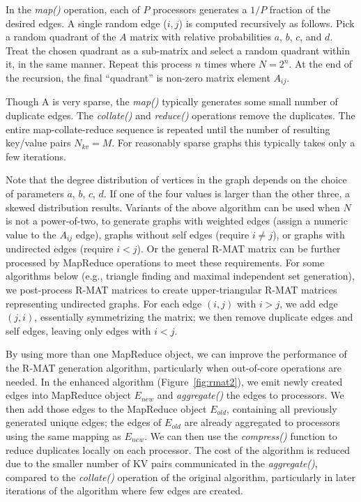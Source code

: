 In the {\it map()} operation, each of $P$ processors generates a $1/P$
fraction of the desired edges.  A single random edge ($i,j$) is computed
recursively as follows.  Pick a random quadrant of the $A$ matrix with
relative probabilities $a$, $b$, $c$, and $d$.  Treat the chosen
quadrant as a sub-matrix and select a random quadrant within it, in
the same manner.  Repeat this process $n$ times where $N = 2^n$.  At
the end of the recursion, the final ``quadrant'' is non-zero matrix
element $A_{ij}$.

Though A is very sparse, the {\it map()} typically generates some
small number of duplicate edges.  The {\it collate()} and {\it
reduce()} operations remove the duplicates.  The entire
map-collate-reduce sequence is repeated until the number of resulting
key/value pairs $N_{kv} = M$.  For reasonably sparse graphs this
typically takes only a few iterations.

Note that the degree distribution of vertices in the graph depends on
the choice of parameters $a$, $b$, $c$, $d$.  If one of the four
values is larger than the other three, a skewed distribution results.
Variants of the above algorithm can be used when $N$ is not a
power-of-two, to generate graphs with weighted edges (assign a numeric
value to the $A_{ij}$ edge), graphs without self edges (require $i \ne
j$), or graphs with undirected edges (require $i < j$).  Or the
general R-MAT matrix can be further processed by MapReduce operations
to meet these requirements.  For some algorithms below (e.g., triangle
finding and maximal independent set generation), we post-process R-MAT
matrices to create upper-triangular R-MAT matrices representing
undirected graphs.  For each edge $(i,j)$ with $i>j$, we add edge
$(j,i)$, essentially symmetrizing the matrix; we then remove duplicate
edges and self edges, leaving only edges with $i<j$.

By using more than one MapReduce object, we can improve the
performance of the R-MAT generation algorithm, particularly when
out-of-core operations are needed.  In the enhanced algorithm
(Figure~\ref{fig:rmat2}), we emit newly created edges into MapReduce
object $E_{new}$ and {\it aggregate()} the edges to processors.  We
then add those edges to the MapReduce object $E_{old}$, containing all
previously generated unique edges; the edges of $E_{old}$ are already
aggregated to processors using the same mapping as $E_{new}$.  We can
then use the {\it compress()} function to reduce duplicates locally on
each processor.  The cost of the algorithm is reduced due to the
smaller number of KV pairs communicated in the {\it aggregate()},
compared to the {\it collate()} operation of the original algorithm,
particularly in later iterations of the algorithm where few edges are
created.

